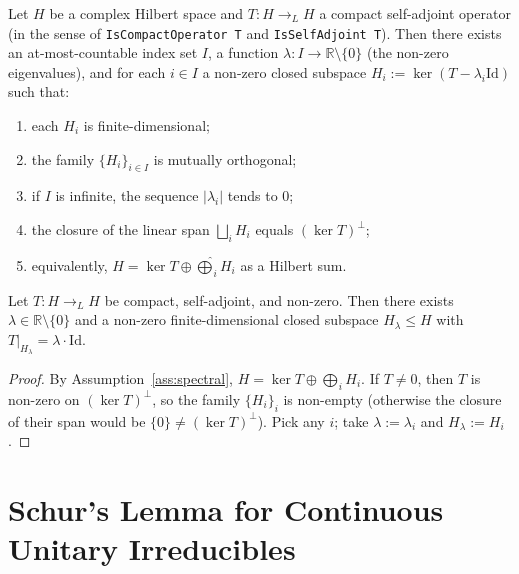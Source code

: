 \begin{assumption}
  \label{ass:spectral}
  Let $H$ be a complex Hilbert space and $T : H \to_L H$ a compact
  self-adjoint operator (in the sense of \texttt{IsCompactOperator
  T} and \texttt{IsSelfAdjoint T}). Then there exists an at-most-countable
  index set $I$, a function $\lambda : I \to \mathbb R \setminus \{0\}$
  (the non-zero eigenvalues), and for each $i \in I$ a non-zero closed
  subspace $H_i := \ker(T - \lambda_i \mathrm{Id})$ such that:
  \begin{enumerate}
    \item each $H_i$ is finite-dimensional;
    \item the family $\{H_i\}_{i \in I}$ is mutually orthogonal;
    \item if $I$ is infinite, the sequence $|\lambda_i|$ tends to $0$;
    \item the closure of the linear span $\bigsqcup_i H_i$ equals
      $(\ker T)^\perp$;
    \item equivalently, $H = \ker T \oplus \widehat{\bigoplus}_i H_i$
      as a Hilbert sum.
  \end{enumerate}
\end{assumption}

\begin{theorem}
  \label{thm:spectral-nonzero-eval}
  \leanok
  Let $T : H \to_L H$ be compact, self-adjoint, and non-zero. Then there
  exists $\lambda \in \mathbb R \setminus \{0\}$ and a non-zero
  finite-dimensional closed subspace $H_\lambda \leq H$ with
  $T|_{H_\lambda} = \lambda \cdot \mathrm{Id}$.
\end{theorem}

\begin{proof}
  By Assumption~\ref{ass:spectral}, $H = \ker T \oplus \widehat{\bigoplus}_i H_i$.
  If $T \neq 0$, then $T$ is non-zero on $(\ker T)^\perp$, so the family
  $\{H_i\}_i$ is non-empty (otherwise the closure of their span would be
  $\{0\} \neq (\ker T)^\perp$). Pick any $i$; take $\lambda := \lambda_i$
  and $H_\lambda := H_i$.
\end{proof}


\chapter{Schur's Lemma for Continuous Unitary Irreducibles}
\label{chap:schur}

